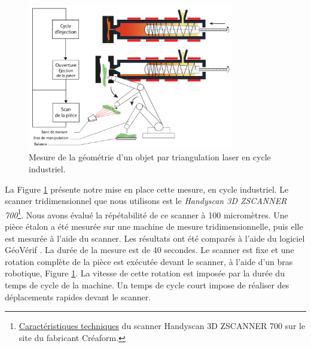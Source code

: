 \begin{figure}[tbhp]
	\centering
	\includegraphics[width=0.8\textwidth]{../Chap2/Figures/online_scan.pdf}
	\caption{Mesure de la géométrie d'un objet par triangulation laser en cycle industriel.}
	\label{fig:online_scan}
\end{figure}
La Figure \ref{fig:online_scan} présente notre mise en place cette mesure, en cycle industriel.
Le scanner tridimensionnel que nous utilisons est le \textit{Handyscan 3D ZSCANNER 700}\footnote{\href{https://www.creaform3d.com/fr/soutien-la-clientele/produits-retires/handyscan-3d-de-1re-generation-zscanner-700}{Caractéristiques techniques} du scanner Handyscan 3D ZSCANNER 700 sur le site du fabricant Créaform.}.
Nous avons évalué la répétabilité de ce scanner à 100 micromètres.
Une pièce étalon a été mesurée sur une machine de mesure tridimensionnelle, puis elle est mesurée à l'aide du scanner.
Les résultats ont été comparés à l'aide du logiciel GéoVérif \cite{pairel_maitrise_2016}.
La durée de la mesure est de 40 secondes.
Le scanner est fixe et une rotation complète de la pièce est exécutée devant le scanner, à l'aide d'un bras robotique, Figure \ref{fig:online_scan}.
La vitesse de cette rotation est imposée par la durée du temps de cycle de la machine.
Un temps de cycle court impose de réaliser des déplacements rapides devant le scanner.


